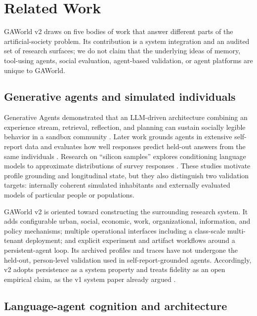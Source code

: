 \section{Related Work}
\label{sec:related-work}

GAWorld v2 draws on five bodies of work that answer different parts of the
artificial-society problem.  Its contribution is a system integration and an
audited set of research surfaces; we do not claim that the underlying ideas
of memory, tool-using agents, social evaluation, agent-based validation, or
agent platforms are unique to GAWorld.

\subsection{Generative agents and simulated individuals}

Generative Agents demonstrated that an LLM-driven architecture combining an
experience stream, retrieval, reflection, and planning can sustain socially
legible behavior in a sandbox community \citep{park2023generative}.  Later
work grounds agents in extensive self-report data and evaluates how well
responses predict held-out answers from the same individuals
\citep{park2024grounded}.  Research on ``silicon samples'' explores
conditioning language models to approximate distributions of survey responses
\citep{argyle2023outofone}.  These studies motivate profile grounding and
longitudinal state, but they also distinguish two validation targets:
internally coherent simulated inhabitants and externally evaluated models of
particular people or populations.

GAWorld v2 is oriented toward constructing the surrounding research system.
It adds configurable urban, social, economic, work, organizational,
information, and policy mechanisms; multiple operational interfaces including
a class-scale multi-tenant deployment; and explicit experiment and artifact
workflows around a persistent-agent loop.  Its archived profiles and traces
have not undergone the held-out, person-level validation used in
self-report-grounded agents.  Accordingly, v2 adopts persistence as a system
property and treats fidelity as an open empirical claim, as the v1 system
paper already argued \citep{gawoerldv1}.

\subsection{Language-agent cognition and architecture}

